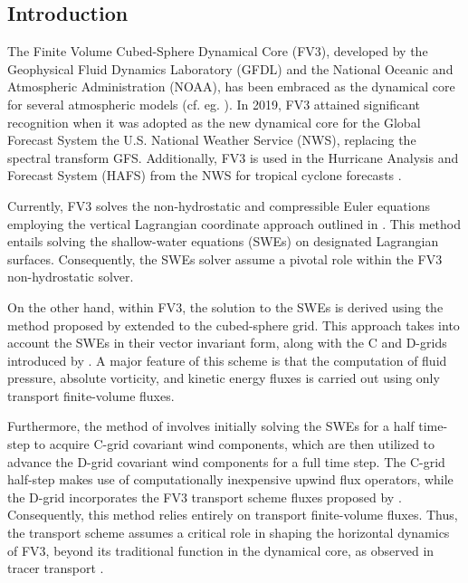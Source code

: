 \documentclass[preprint,12pt]{elsarticle}
\begin{document}
\begin{linenumbers}


\newpage
\section{Introduction}
\label{intro}
The Finite Volume Cubed-Sphere Dynamical Core (FV3), developed by the Geophysical Fluid Dynamics Laboratory (GFDL) and the National Oceanic and Atmospheric Administration (NOAA), 
has been embraced as the dynamical core for several atmospheric models (cf. eg. \cite{zhou:2015,lee:2020, bertrand:2020,harris:2020,martin:2022,zhang:2024}).
In 2019, FV3 attained significant recognition when it was adopted as the new dynamical core for the Global Forecast System the U.S. National Weather Service (NWS), replacing the spectral transform GFS.
Additionally, FV3 is used in the Hurricane Analysis and Forecast System (HAFS) from the NWS for tropical cyclone forecasts \cite{dong:2020}.


Currently, FV3 solves the non-hydrostatic and compressible Euler equations employing the vertical Lagrangian coordinate approach outlined in \cite{lin:2004}.
This method entails solving the shallow-water equations (SWEs) on designated Lagrangian surfaces. 
Consequently, the SWEs solver assume a pivotal role within the FV3 non-hydrostatic solver.

On the other hand, within FV3, the solution to the SWEs is derived using the method proposed by \cite{lin:1997} extended to the cubed-sphere grid.
This approach takes into account the SWEs in their vector invariant form, along with the C and D-grids introduced by \cite{arakawa:1977}.
A major feature of this scheme is that the computation of fluid pressure, absolute vorticity, and kinetic energy fluxes is carried out using only transport finite-volume fluxes. 

Furthermore, the method of  \cite{lin:1997} involves initially solving the SWEs for a half time-step to acquire C-grid covariant wind components, 
which are then utilized to advance the D-grid covariant wind components for a full time step. 
The C-grid half-step makes use of computationally inexpensive upwind flux operators, while the D-grid incorporates the FV3 transport scheme fluxes proposed by \cite{lin:1996,putman:2007}.
Consequently, this method relies entirely on transport finite-volume fluxes. 
Thus, the transport scheme assumes a critical role in shaping the horizontal dynamics of FV3, beyond its traditional function in the dynamical core, as observed in tracer transport \cite{will:2007}.


\end{linenumbers}
\end{document}
